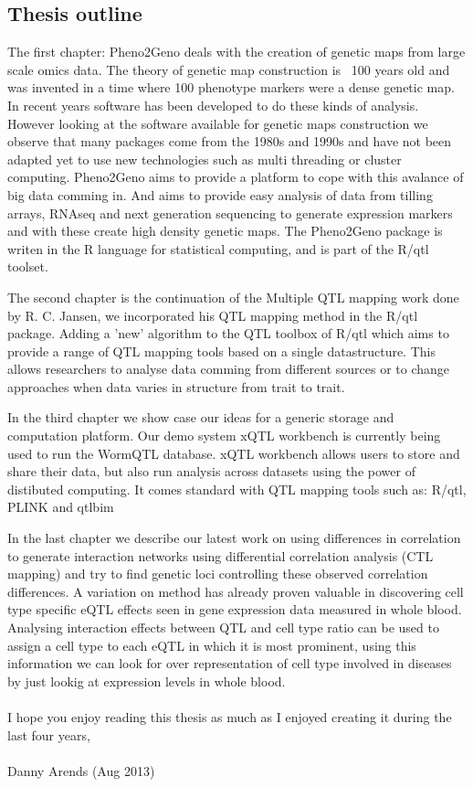 \subsection{Thesis outline}

The first chapter: Pheno2Geno deals with the creation of genetic maps from large scale omics data. 
The theory of genetic map construction is ~100 years old and was invented in a time where 100 
phenotype markers were a dense genetic map. In recent years software has been developed to do these 
kinds of analysis. However looking at the software available for genetic maps construction we 
observe that many packages come from the 1980s and 1990s and have not been adapted yet to use new 
technologies such as multi threading or cluster computing. Pheno2Geno aims to provide a platform to 
cope with this avalance of big data comming in. And aims to provide easy analysis of data from 
tilling arrays, RNAseq and next generation sequencing to generate expression markers and with these 
create high density genetic maps. The Pheno2Geno package is writen in the R language for statistical 
computing, and is part of the R/qtl toolset.

The second chapter is the continuation of the Multiple QTL mapping work done by R. C. Jansen, we 
incorporated his QTL mapping method in the R/qtl package. Adding a 'new' algorithm to the QTL 
toolbox of R/qtl which aims to provide a range of QTL mapping tools based on a single datastructure. 
This allows researchers to analyse data comming from different sources or to change approaches when 
data varies in structure from trait to trait.

In the third chapter we show case our ideas for a generic storage and computation platform. Our demo 
system xQTL workbench is currently being used to run the WormQTL database. xQTL workbench allows 
users to store and share their data, but also run analysis across datasets using the power of 
distibuted computing. It comes standard with  QTL mapping tools such as: R/qtl, PLINK and qtlbim

In the last chapter we describe our latest work on using differences in correlation to generate 
interaction networks using differential correlation analysis (CTL mapping) and try to find genetic 
loci controlling these observed correlation differences. A variation on method has already proven 
valuable in discovering cell type specific eQTL effects seen in gene expression data measured in 
whole blood. Analysing interaction effects between QTL and cell type ratio can be used to assign a 
cell type to each eQTL in which it is most prominent, using this information we can look for over 
representation of cell type involved in diseases by just lookig at expression levels in whole blood.\\\\

I hope you enjoy reading this thesis as much as I enjoyed creating it during the last four years,\\\\

Danny Arends (Aug 2013)
